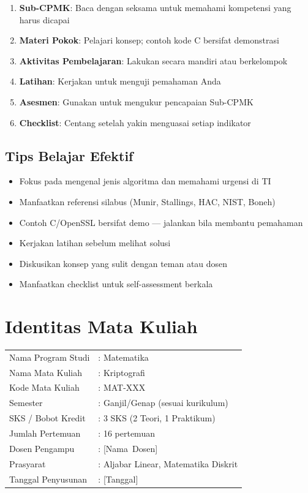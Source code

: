 \documentclass[main.tex]{subfiles}
\begin{document}
\begin{enumerate}
  \item \textbf{Sub-CPMK}: Baca dengan seksama untuk memahami kompetensi yang harus dicapai
  \item \textbf{Materi Pokok}: Pelajari konsep; contoh kode C bersifat demonstrasi
  \item \textbf{Aktivitas Pembelajaran}: Lakukan secara mandiri atau berkelompok
  \item \textbf{Latihan}: Kerjakan untuk menguji pemahaman Anda
  \item \textbf{Asesmen}: Gunakan untuk mengukur pencapaian Sub-CPMK
  \item \textbf{Checklist}: Centang setelah yakin menguasai setiap indikator
\end{enumerate}

\section*{Tips Belajar Efektif}

\begin{itemize}
  \item Fokus pada mengenal jenis algoritma dan memahami urgensi di TI
  \item Manfaatkan referensi silabus (Munir, Stallings, HAC, NIST, Boneh)
  \item Contoh C/OpenSSL bersifat demo --- jalankan bila membantu pemahaman
  \item Kerjakan latihan sebelum melihat solusi
  \item Diskusikan konsep yang sulit dengan teman atau dosen
  \item Manfaatkan checklist untuk self-assessment berkala
\end{itemize}

\cleardoublepage

\chapter*{Identitas Mata Kuliah}

\begin{tabular}{ll}
  Nama Program Studi & : Matematika \\
  Nama Mata Kuliah & : Kriptografi \\
  Kode Mata Kuliah & : MAT-XXX \\
  Semester & : Ganjil/Genap (sesuai kurikulum) \\
  SKS / Bobot Kredit & : 3 SKS (2 Teori, 1 Praktikum) \\
  Jumlah Pertemuan & : 16 pertemuan \\
  Dosen Pengampu & : \mbox{[Nama Dosen]} \\
  Prasyarat & : Aljabar Linear, Matematika Diskrit \\
  Tanggal Penyusunan & : [Tanggal] \\
\end{tabular}
\end{document}
